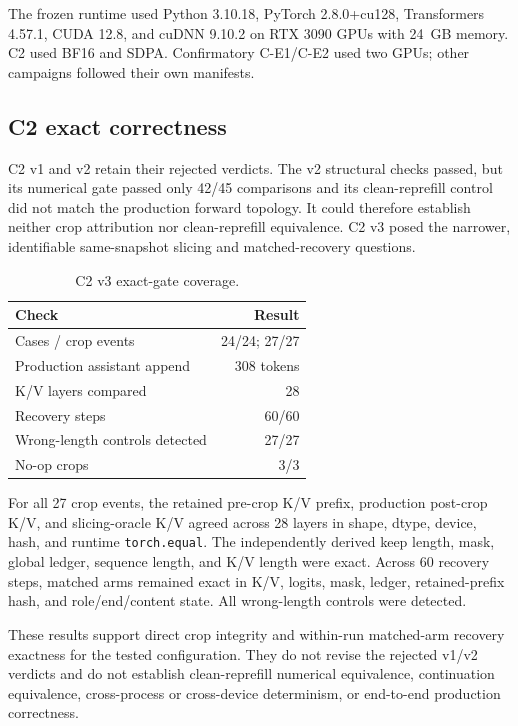 The frozen runtime used Python 3.10.18, PyTorch 2.8.0+cu128, Transformers 4.57.1, CUDA 12.8, and cuDNN 9.10.2 on RTX 3090 GPUs with 24~GB memory. C2 used BF16 and SDPA. Confirmatory C-E1/C-E2 used two GPUs; other campaigns followed their own manifests.

\subsection{C2 exact correctness}

C2 v1 and v2 retain their rejected verdicts. The v2 structural checks passed, but its numerical gate passed only 42/45 comparisons and its clean-reprefill control did not match the production forward topology. It could therefore establish neither crop attribution nor clean-reprefill equivalence. C2 v3 posed the narrower, identifiable same-snapshot slicing and matched-recovery questions.

\begin{table}[t]
\centering
\small
\caption{C2 v3 exact-gate coverage.}
\label{tab:c2}
\begin{tabularx}{\linewidth}{@{}Yr@{}}
\toprule
Check & Result \\
\midrule
Cases / crop events & 24/24; 27/27 \\
Production assistant append & 308 tokens \\
K/V layers compared & 28 \\
Recovery steps & 60/60 \\
Wrong-length controls detected & 27/27 \\
No-op crops & 3/3 \\
\bottomrule
\end{tabularx}
\end{table}

For all 27 crop events, the retained pre-crop K/V prefix, production post-crop K/V, and slicing-oracle K/V agreed across 28 layers in shape, dtype, device, hash, and runtime \texttt{torch.equal}. The independently derived keep length, mask, global ledger, sequence length, and K/V length were exact. Across 60 recovery steps, matched arms remained exact in K/V, logits, mask, ledger, retained-prefix hash, and role/end/content state. All wrong-length controls were detected.

These results support direct crop integrity and within-run matched-arm recovery exactness for the tested configuration. They do not revise the rejected v1/v2 verdicts and do not establish clean-reprefill numerical equivalence, continuation equivalence, cross-process or cross-device determinism, or end-to-end production correctness.

